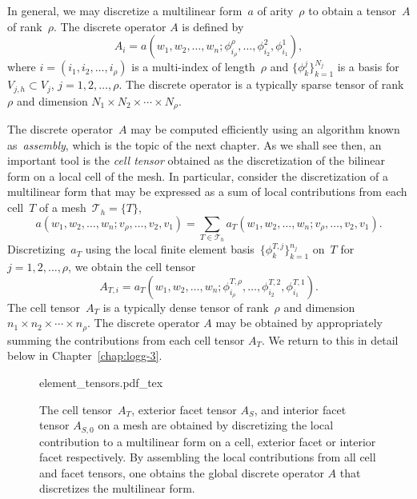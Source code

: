 In general, we may discretize a multilinear form~$a$ of arity~$\rho$
to obtain a tensor~$A$ of rank~$\rho$. The discrete operator $A$ is
defined by
\begin{equation}
  A_i = a(w_1, w_2, \ldots, w_n;
  \phi^{\rho}_{i_{\rho}}, \ldots, \phi^2_{i_2}, \phi^1_{i_1}),
\end{equation}
where $i = (i_1, i_2, \ldots, i_{\rho})$ is a multi-index of
length~$\rho$ and $\{\phi^j_k\}_{k=1}^{N_j}$ is a basis for $V_{j,h}
\subset V_j$, $j = 1,2,\ldots,\rho$. The discrete operator is a
typically sparse tensor of rank~$\rho$ and dimension $N_1 \times N_2
\times \cdots \times N_{\rho}$.

The discrete operator~$A$ may be computed efficiently using an
algorithm known as~\emph{assembly}, which is the topic of the next
chapter. As we shall see then, an important tool is the \emph{cell
  tensor} obtained as the discretization of the bilinear form on a
local cell of the mesh. In particular, consider the discretization of
a multilinear form that may be expressed as a sum of local
contributions from each cell~$T$ of a mesh~$\mathcal{T}_h = \{T\}$,
\begin{equation}
  a(w_1, w_2, \ldots, w_n; v_{\rho}, \ldots, v_2, v_1)
  = \sum_{T\in\mathcal{T}_h}
  a_T(w_1, w_2, \ldots, w_n; v_{\rho}, \ldots, v_2, v_1).
\end{equation}
Discretizing~$a_T$ using the local finite element
basis~$\{\phi^{T,j}_k\}_{k=1}^{n_j}$ on~$T$ for $j = 1,
2, \ldots, \rho$, we obtain the cell tensor
\begin{equation} \label{eq:kirby-5:celltensor}
  A_{T,i}
  = a_T(w_1, w_2, \ldots, w_n;
        \phi^{T,\rho}_{i_{\rho}}, \ldots, \phi^{T,2}_{i_2}, \phi^{T,1}_{i_1}).
\end{equation}
The cell tensor~$A_T$ is a typically dense tensor of rank~$\rho$ and
dimension $n_1 \times n_2 \times \cdots \times n_{\rho}$. The discrete
operator $A$ may be obtained by appropriately summing the
contributions from each cell tensor $A_T$. We return to this in detail
below in Chapter~\ref{chap:logg-3}.

\begin{figure}
  \begin{center}
    \def\svgwidth{\largefig}
    {element_tensors.pdf_tex}
    \caption{The cell tensor~$A_T$, exterior facet tensor $A_S$, and
      interior facet tensor $A_{S,0}$ on a mesh are obtained by
      discretizing the local contribution to a multilinear form on a
      cell, exterior facet or interior facet respectively. By
      assembling the local contributions from all cell and facet
      tensors, one obtains the global discrete operator $A$ that
      discretizes the multilinear form.}
    \label{fig:kirby-5:tensors}
  \end{center}
\end{figure}

